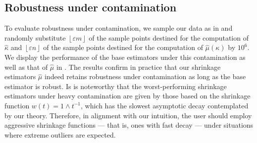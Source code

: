 \documentclass{article}
\theoremstyle{plain}
\theoremstyle{definition}
\begin{document}
\subsection{Robustness under contamination}
To evaluate robustness under contamination, we sample our data as in  and randomly substitute \( \left\lfloor \varepsilon m \right\rfloor \) of the sample points destined for the computation of \( \widehat{\kappa }  \) and \( \left\lfloor \varepsilon n  \right\rfloor \) of the sample points destined for the computation of \( \widehat{\mu }(\kappa )  \) by \( 10^6 \). We display the performance of the base estimators under this contamination as well as that of \( \widehat{\mu }  \) in . The results confirm in practice that our shrinkage estimators \( \widehat{\mu }  \) indeed retains robustness under contamination as long as the base estimator is robust. Is is noteworthy that the worst-performing shrinkage estimators under heavy contamination are given by those based on the shrinkage function \( w(t)=1 \wedge t^{-1} \), which has the slowest asymptotic decay contemplated by our theory. Therefore, in alignment with our intuition, the user should employ aggressive shrinkage functions --- that is, ones with fast decay --- under situations where extreme outliers are expected.
\end{document}
